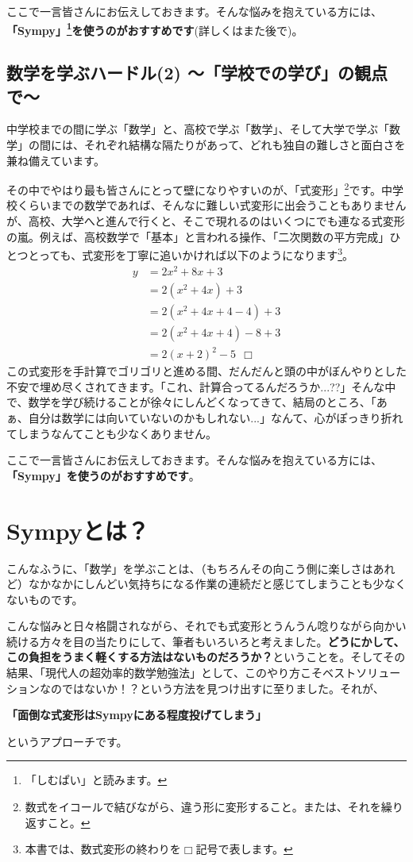 \documentclass[12pt, a5paper]{bxjsbook}
\begin{document}
ここで一言皆さんにお伝えしておきます。そんな悩みを抱えている方には、{\bf 「Sympy」\footnote{「しむぱい」と読みます。}を使うのがおすすめです}(詳しくはまた後で)。

\subsection{数学を学ぶハードル(2) 〜「学校での学び」の観点で〜}
中学校までの間に学ぶ「数学」と、高校で学ぶ「数学」、そして大学で学ぶ「数学」の間には、それぞれ結構な隔たりがあって、どれも独自の難しさと面白さを兼ね備えています。

その中でやはり最も皆さんにとって壁になりやすいのが、「式変形」\footnote{数式をイコールで結びながら、違う形に変形すること。または、それを繰り返すこと。}です。中学校くらいまでの数学であれば、そんなに難しい式変形に出会うこともありませんが、高校、大学へと進んで行くと、そこで現れるのはいくつにでも連なる式変形の嵐。例えば、高校数学で「基本」と言われる操作、「二次関数の平方完成」ひとつとっても、式変形を丁寧に追いかければ以下のようになります\footnote{本書では、数式変形の終わりを$\Box$記号で表します。}。
\begin{align*}
    y &= 2x^2 + 8x + 3\\
    &= 2(x^2+4x)+3\\
    &= 2(x^2+4x+4-4)+3\\
    &= 2(x^2+4x+4)-8+3\\
    &= 2(x+2)^2-5\ \ \Box
\end{align*}
この式変形を手計算でゴリゴリと進める間、だんだんと頭の中がぼんやりとした不安で埋め尽くされてきます。「これ、計算合ってるんだろうか...??」そんな中で、数学を学び続けることが徐々にしんどくなってきて、結局のところ、「あぁ、自分は数学には向いていないのかもしれない...」なんて、心がぽっきり折れてしまうなんてことも少なくありません。

ここで一言皆さんにお伝えしておきます。そんな悩みを抱えている方には、{\bf 「Sympy」を使うのがおすすめです}。
\section{Sympyとは？}
こんなふうに、「数学」を学ぶことは、（もちろんその向こう側に楽しさはあれど）なかなかにしんどい気持ちになる作業の連続だと感じてしまうことも少なくないものです。

こんな悩みと日々格闘されながら、それでも式変形とうんうん唸りながら向かい続ける方々を目の当たりにして、筆者もいろいろと考えました。{\bf どうにかして、この負担をうまく軽くする方法はないものだろうか？}ということを。そしてその結果、「現代人の超効率的数学勉強法」として、このやり方こそベストソリューションなのではないか！？という方法を見つけ出すに至りました。それが、
\begin{center}
{\bf 「面倒な式変形はSympyにある程度投げてしまう」}
\end{center}
というアプローチです。
\end{document}
